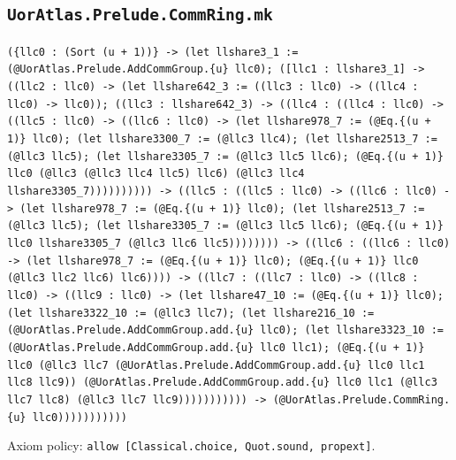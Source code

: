 \documentclass[11pt]{article}
\begin{document}
\subsection*{\texttt{UorAtlas.Prelude.CommRing.mk}}
\noindent\texttt{(\{llc0 : (Sort (u + 1))\} -> (let llshare3\_1 := (@UorAtlas.Prelude.AddCommGroup.\{u\} llc0); ([llc1 : llshare3\_1] -> ((llc2 : llc0) -> (let llshare642\_3 := ((llc3 : llc0) -> ((llc4 : llc0) -> llc0)); ((llc3 : llshare642\_3) -> ((llc4 : ((llc4 : llc0) -> ((llc5 : llc0) -> ((llc6 : llc0) -> (let llshare978\_7 := (@Eq.\{(u + 1)\} llc0); (let llshare3300\_7 := (@llc3 llc4); (let llshare2513\_7 := (@llc3 llc5); (let llshare3305\_7 := (@llc3 llc5 llc6); (@Eq.\{(u + 1)\} llc0 (@llc3 (@llc3 llc4 llc5) llc6) (@llc3 llc4 llshare3305\_7)))))))))) -> ((llc5 : ((llc5 : llc0) -> ((llc6 : llc0) -> (let llshare978\_7 := (@Eq.\{(u + 1)\} llc0); (let llshare2513\_7 := (@llc3 llc5); (let llshare3305\_7 := (@llc3 llc5 llc6); (@Eq.\{(u + 1)\} llc0 llshare3305\_7 (@llc3 llc6 llc5)))))))) -> ((llc6 : ((llc6 : llc0) -> (let llshare978\_7 := (@Eq.\{(u + 1)\} llc0); (@Eq.\{(u + 1)\} llc0 (@llc3 llc2 llc6) llc6)))) -> ((llc7 : ((llc7 : llc0) -> ((llc8 : llc0) -> ((llc9 : llc0) -> (let llshare47\_10 := (@Eq.\{(u + 1)\} llc0); (let llshare3322\_10 := (@llc3 llc7); (let llshare216\_10 := (@UorAtlas.Prelude.AddCommGroup.add.\{u\} llc0); (let llshare3323\_10 := (@UorAtlas.Prelude.AddCommGroup.add.\{u\} llc0 llc1); (@Eq.\{(u + 1)\} llc0 (@llc3 llc7 (@UorAtlas.Prelude.AddCommGroup.add.\{u\} llc0 llc1 llc8 llc9)) (@UorAtlas.Prelude.AddCommGroup.add.\{u\} llc0 llc1 (@llc3 llc7 llc8) (@llc3 llc7 llc9))))))))))) -> (@UorAtlas.Prelude.CommRing.\{u\} llc0)))))))))))}\par
\noindent Axiom policy: \texttt{allow [Classical.choice, Quot.sound, propext]}.\par
\end{document}
